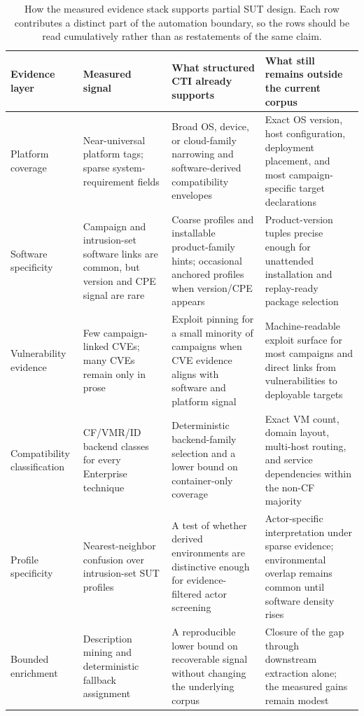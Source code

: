 \documentclass[sigconf]{acmart}
\begin{document}
\begin{table}[!t]
\caption{How the measured evidence stack supports partial SUT design. Each row contributes a distinct part of the automation boundary, so the rows should be read cumulatively rather than as restatements of the same claim.}\label{tab:evidence_stack_sut}
\centering\small
\renewcommand{\arraystretch}{1.12}
\begin{tabular}{@{}%
>{\raggedright\arraybackslash}p{}
>{\raggedright\arraybackslash}p{}
>{\raggedright\arraybackslash}p{}
>{\raggedright\arraybackslash}p{}@{}}
\toprule
\textbf{Evidence layer}
& \textbf{Measured signal}
& \textbf{What structured CTI already supports}
& \textbf{What still remains outside the current corpus} \\
\midrule

Platform coverage
& Near-universal platform tags; sparse system-requirement fields
& Broad OS, device, or cloud-family narrowing and software-derived compatibility envelopes
& Exact OS version, host configuration, deployment placement, and most campaign-specific target declarations \\

Software specificity
& Campaign and intrusion-set software links are common, but version and CPE signal are rare
& Coarse profiles and installable product-family hints; occasional anchored profiles when version/CPE appears
& Product-version tuples precise enough for unattended installation and replay-ready package selection \\

Vulnerability evidence
& Few campaign-linked CVEs; many CVEs remain only in prose
& Exploit pinning for a small minority of campaigns when CVE evidence aligns with software and platform signal
& Machine-readable exploit surface for most campaigns and direct links from vulnerabilities to deployable targets \\

Compatibility classification
& CF/VMR/ID backend classes for every Enterprise technique
& Deterministic backend-family selection and a lower bound on container-only coverage
& Exact VM count, domain layout, multi-host routing, and service dependencies within the non-CF majority \\

Profile specificity
& Nearest-neighbor confusion over intrusion-set SUT profiles
& A test of whether derived environments are distinctive enough for evidence-filtered actor screening
& Actor-specific interpretation under sparse evidence; environmental overlap remains common until software density rises \\

Bounded enrichment
& Description mining and deterministic fallback assignment
& A reproducible lower bound on recoverable signal without changing the underlying corpus
& Closure of the gap through downstream extraction alone; the measured gains remain modest \\

\bottomrule
\end{tabular}
\end{table}
\end{document}
